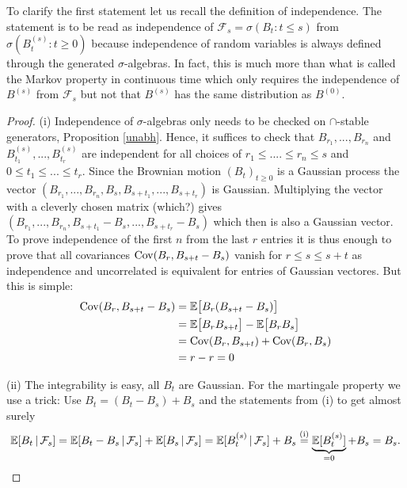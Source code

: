 To clarify the first statement let us recall the definition of independence. The statement is to be read as independence of $\mathcal F_s=\sigma(B_t: t\leq s)$ from $\sigma(B_t^{(s)}: t\geq 0)$ because independence of random variables is always defined through the generated $\sigma$-algebras. In fact, this is much more than what is called the Markov property in continuous time which only requires the independence of $B^{(s)}$ from $\mathcal F_s$ but not that $B^{(s)}$ has the same distribution as $B^{(0)}$. 
\begin{proof}[Proof]
(i) Independence of $\sigma$-algebras only needs to be checked on $\cap$-stable generators, Proposition \ref{unabh}. Hence, it suffices to 
check that $B_{r_1},...,B_{r_n}$ and $B_{t_1}^{(s)},...,B_{t_r}^{(s)}$ are independent for all choices of $r_1\leq ....\leq r_n\leq s$ and $0\leq t_1\leq ...\leq t_r$. 
			Since the Brownian motion $(B_t)_{t\geq 0}$ is a Gaussian process the vector 
			$(B_{r_1},...,B_{r_n},B_s,B_{s+t_1},...,B_{s+t_r})$ is Gaussian. Multiplying the vector with a cleverly chosen matrix (which?) gives $(B_{r_1},..., B_{r_n},B_{s+t_1}-B_s,..., B_{s+t_r}-B_{s})$ which then is also a Gaussian vector. To prove independence of the first $n$ from the last $r$ entries it is thus enough to prove that all covariances $\operatorname{Cov}(B_r,B_{s+t}-B_s)$ vanish for $r\leq s\leq s+t$ as independence and uncorrelated is equivalent for entries of Gaussian vectores. But this is simple:
			\begin{align*}
				\text{Cov}(B_{r},B_{s+t}-B_s) &= \mathbb{E} \big[ B_{r}(B_{s+t}-B_s)\big] \\
												&= \mathbb{E} \big[B_{r}B_{s+t}\big] - \mathbb{E} \big[B_{r}B_s\big]\\
												&=\text{Cov}(B_{r},B_{s+t})+\text{Cov}(B_{r},B_s)\\
												&= r - r = 0
			\end{align*}
			
	(ii) The integrability is easy, all $B_t$ are Gaussian. For the martingale property we use a trick: Use $B_t = (B_t-B_s)+B_s$ and the statements from (i) to get almost surely
			\begin{align*}
				\mathbb{E} [B_t \,|\,\mathcal{F}_s] = \mathbb{E} [B_t - B_s\,|\,\mathcal{F}_s] + \mathbb{E}[B_s\,|\,\mathcal{F}_s] 
										= \mathbb{E} [B_t^{(s)}\,|\,\mathcal{F}_s] + B_s 
										\overset{\text{(i)}}{=} \underbrace{\mathbb{E}[B_t^{(s)}]}_{=0} + B_s=B_s.
			\end{align*}
\end{proof}
\marginpar{\textcolor{red}{Lecture 24}}

